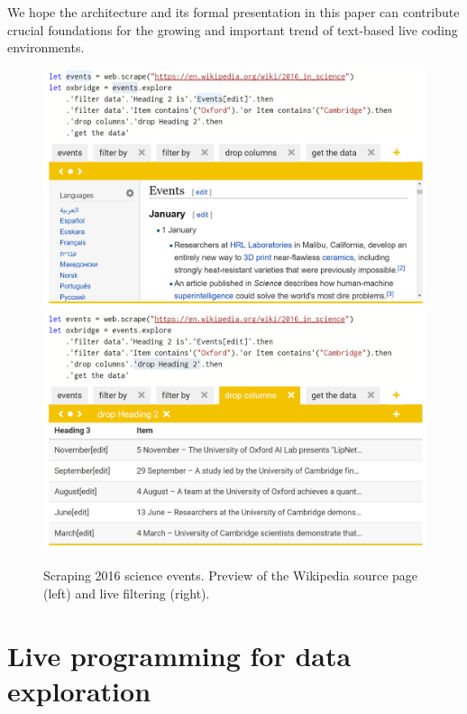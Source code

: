 \documentclass[sigplan,10pt]{acmart}\settopmatter{printfolios=true,printccs=false,printacmref=false}
\theoremstyle{plain}
\theoremstyle{definition}
\begin{document}
\noindent
We hope the architecture and its formal presentation in this paper can contribute crucial 
foundations for the growing and important trend of text-based live coding environments.


\begin{figure}
\includegraphics[scale=0.21]{wiki.png}
\includegraphics[scale=0.21]{drop.png}
\caption{Scraping 2016 science events. Preview of the Wikipedia source page (left) and live filtering (right).}
\label{fig:thegamma}
\end{figure}


\section{Live programming for data exploration}
\label{sec:live}
\end{document}
